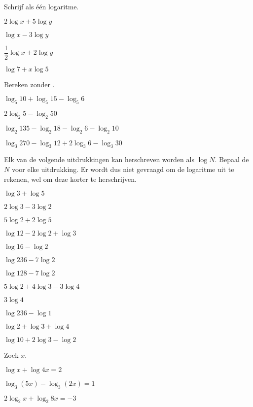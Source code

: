 \documentclass[12pt,twoside,a4paper]{article}
\begin{document}
\begin{oefening} %
Schrijf als één logaritme.
\begin{exlist}{2}
  \item $2\log x + 5 \log y$
  \item $\log x - 3 \log y$
  \item $\dfrac{1}{2}\log x + 2 \log y$
  \item $\log 7 + x \log 5$
\end{exlist}
\end{oefening}

\begin{oefening} %
Bereken zonder .
\begin{exlist}{2}
  \item $\log_5 10 + \log_5 15 - \log_5 6$
  \item $2\log_2 5 - \log_2 50$
  \item $\log_2 135 - \log_2 18 - \log_2 6 - \log_2 10$
  \item $\log_3 270 - \log_3 12 + 2\log_3 6 - \log_3 30$
\end{exlist}
\end{oefening}

\begin{oefening} %
Elk van de volgende uitdrukkingen kan herschreven worden als $\log N$. Bepaal de $N$ voor elke uitdrukking. Er wordt dus niet gevraagd om de logaritme uit te rekenen, wel om deze korter te herschrijven.
\begin{exlist}{2}
  \item $\log 3 + \log 5$
  \item $2\log 3 - 3\log 2$
  \item $5\log 2 + 2\log 5$
  \item $\log 12 - 2\log 2 + \log 3$
  \item $\log 16 - \log 2$
  \item $\log 236 - 7\log 2$
  \item $\log 128 - 7\log 2$
  \item $5\log 2 + 4\log 3 - 3\log 4$
  \item $3\log 4$
  \item $\log 236 - \log 1$
  \item $\log 2 + \log 3 + \log 4$
  \item $\log 10 + 2\log 3 - \log 2$
\end{exlist}
\end{oefening}

\begin{oefening} %
Zoek $x$.
\begin{exlist}{2}
  \item $\log x + \log 4x = 2$
  \item $\log_3(5x) - \log_3(2x) = 1$
  \item $2\log_2 x + \log_2 8x = -3$
\end{exlist}
\end{oefening}
\end{document}
